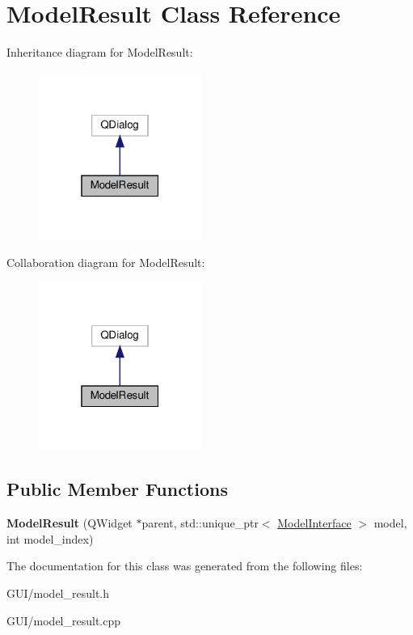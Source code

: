 \hypertarget{classModelResult}{}\section{Model\+Result Class Reference}
\label{classModelResult}


Inheritance diagram for Model\+Result\+:
\nopagebreak
\begin{figure}[H]
\begin{center}
\leavevmode
\includegraphics[width=151pt]{classModelResult__inherit__graph}
\end{center}
\end{figure}


Collaboration diagram for Model\+Result\+:
\nopagebreak
\begin{figure}[H]
\begin{center}
\leavevmode
\includegraphics[width=151pt]{classModelResult__coll__graph}
\end{center}
\end{figure}
\subsection*{Public Member Functions}
\begin{DoxyCompactItemize}
\item 
\mbox{\label{classModelResult_a1dac642410c22e0d6c2c8e036336b546}} 
{\bfseries Model\+Result} (Q\+Widget $\ast$parent, std\+::unique\+\_\+ptr$<$ \hyperlink{classModelInterface}{Model\+Interface} $>$ model, int model\+\_\+index)
\end{DoxyCompactItemize}


The documentation for this class was generated from the following files\+:\begin{DoxyCompactItemize}
\item 
G\+U\+I/model\+\_\+result.\+h\item 
G\+U\+I/model\+\_\+result.\+cpp\end{DoxyCompactItemize}
